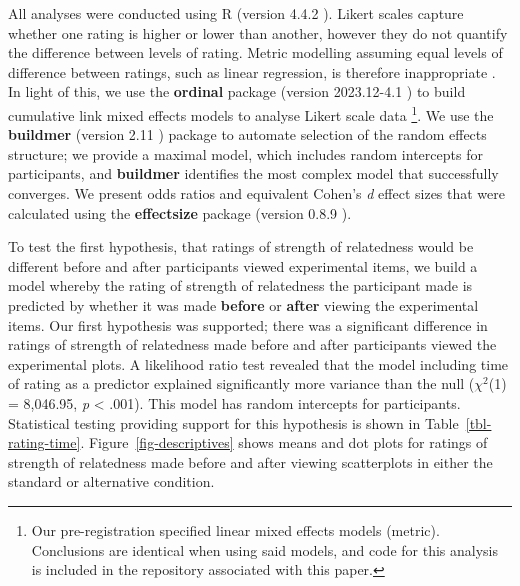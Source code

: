 \documentclass[sigconf]{acmart}
\begin{document}
All analyses were conducted using R (version 4.4.2 \citep{rcore}).
Likert scales capture whether one rating is higher or lower than
another, however they do not quantify the difference between levels of
rating. Metric modelling assuming equal levels of difference between
ratings, such as linear regression, is therefore inappropriate
\citep{liddell_2018}. In light of this, we use the \textbf{ordinal}
package (version 2023.12-4.1 \citep{ordinal}) to build cumulative link
mixed effects models to analyse Likert scale data \footnote{Our
  pre-registration specified linear mixed effects models (metric).
  Conclusions are identical when using said models, and code for this
  analysis is included in the repository associated with this paper.}.
We use the \textbf{buildmer} (version 2.11 \citep{buildmer}) package to
automate selection of the random effects structure; we provide a maximal
model, which includes random intercepts for participants, and
\textbf{buildmer} identifies the most complex model that successfully
converges. We present odds ratios and equivalent Cohen's \emph{d} effect
sizes that were calculated using the \textbf{effectsize} package
(version 0.8.9 \citep{effectsize}).

To test the first hypothesis, that ratings of strength of relatedness
would be different before and after participants viewed experimental
items, we build a model whereby the rating of strength of relatedness
the participant made is predicted by whether it was made \textbf{before}
or \textbf{after} viewing the experimental items. Our first hypothesis
was supported; there was a significant difference in ratings of strength
of relatedness made before and after participants viewed the
experimental plots. A likelihood ratio test revealed that the model
including time of rating as a predictor explained significantly more
variance than the null (\(\chi^2\)(1) = 8,046.95, \emph{p} \textless{}
.001). This model has random intercepts for participants. Statistical
testing providing support for this hypothesis is shown in
Table~\ref{tbl-rating-time}. Figure~\ref{fig-descriptives} shows means
and dot plots for ratings of strength of relatedness made before and
after viewing scatterplots in either the standard or alternative
condition.

\begin{table}

\caption{\label{tbl-rating-time}Statistics for the significant main
effect of rating time. Odds ratio and the equivalent Cohen's \textit{d}
value is also supplied.}


\end{table}%
\end{document}

